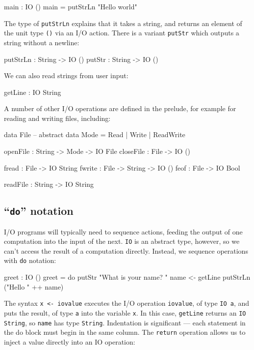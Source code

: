 \begin{code}
main : IO ()
main = putStrLn "Hello world"
\end{code}


\noindent
The type of \texttt{putStrLn} explains that it takes a string, and returns an element of the unit type \texttt{()} via an I/O action.
There is a variant \texttt{putStr} which outputs a string without a newline:

\begin{code}
putStrLn : String -> IO ()
putStr   : String -> IO ()
\end{code}

We can also read strings from user input:

\begin{code}
getLine : IO String
\end{code}


\noindent
A number of other I/O operations are defined in the prelude, for example for reading and writing files, including:

\begin{code}
data File -- abstract
data Mode = Read | Write | ReadWrite

openFile  : String -> Mode -> IO File
closeFile : File -> IO ()

fread  : File -> IO String
fwrite : File -> String -> IO ()
feof   : File -> IO Bool

readFile : String -> IO String
\end{code}


\subsection{``\texttt{do}'' notation}
\label{sect:do}

I/O programs will typically need to sequence actions, feeding the output of one computation into the input of the next.
\texttt{IO} is an abstract type, however, so we can't access the result of a computation directly.
Instead, we sequence operations with \texttt{do} notation:

\begin{code}
greet : IO ()
greet = do putStr "What is your name? "
           name <- getLine
           putStrLn ("Hello " ++ name)
\end{code}


\noindent
The syntax \texttt{x <- iovalue} executes the I/O operation \texttt{iovalue}, of type \texttt{IO a}, and puts the result, of type \texttt{a} into the variable \texttt{x}. 
In this case, \texttt{getLine} returns an \texttt{IO String}, so \texttt{name} has type \texttt{String}. 
Indentation is significant --- each statement in the do block must begin in the same column.
The \texttt{return} operation allows us to inject a value directly into an IO operation:

